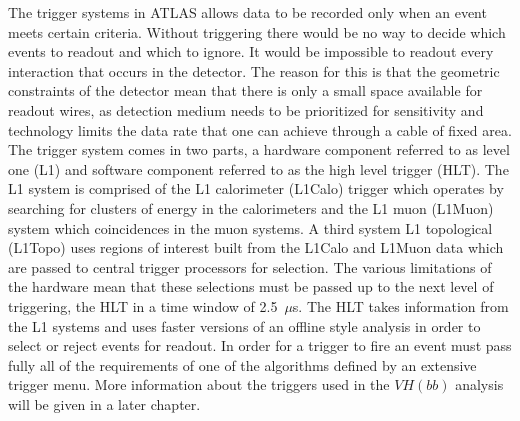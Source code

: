 The trigger systems in ATLAS allows data to be recorded only when an event meets
certain criteria. Without triggering there would be no way to decide which
events to readout and which to ignore. It would be impossible to readout every
interaction that occurs in the detector. The reason for this is that the
geometric constraints of the detector mean that there is only a small space
available for readout wires, as detection medium needs to be prioritized for
sensitivity and technology limits the data rate that one can achieve through a
cable of fixed area. The trigger system comes in two parts, a hardware component
referred to as level one (L1) and software component referred to as the high
level trigger (HLT). The L1 system is comprised of the L1 calorimeter (L1Calo)
trigger which operates by searching for clusters of energy in the calorimeters
and the L1 muon (L1Muon) system which coincidences in the muon systems. A third
system L1 topological (L1Topo) uses regions of interest built from the L1Calo
and L1Muon data which are passed to central trigger processors for selection.
The various limitations of the hardware mean that these selections must be
passed up to the next level of triggering, the HLT in a time window of
2.5~$\mu$s. The HLT takes information from the L1 systems and uses faster
versions of an offline style analysis in order to select or reject events for
readout. In order for a  trigger to fire an event must pass fully all of the
requirements of one of the algorithms defined by an extensive trigger menu. More
information about the triggers used in the $VH(bb)$ analysis will be given in a
later chapter.
